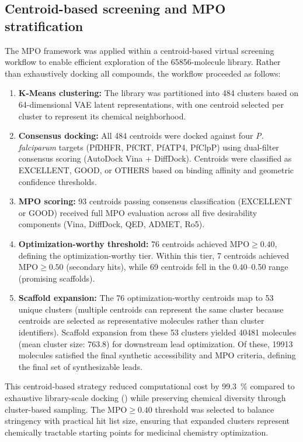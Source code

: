 \documentclass[journal=jcisd8,manuscript=suppinfo]{achemso}
\begin{document}
\subsection*{Centroid-based screening and MPO stratification}

The MPO framework was applied within a centroid-based virtual screening workflow to enable efficient exploration of the \num{65856}-molecule library. Rather than exhaustively docking all compounds, the workflow proceeded as follows:

\begin{enumerate}
\item \textbf{K-Means clustering:} The library was partitioned into \num{484} clusters based on \num{64}-dimensional VAE latent representations, with one centroid selected per cluster to represent its chemical neighborhood.
\item \textbf{Consensus docking:} All \num{484} centroids were docked against four \textit{P. falciparum} targets (PfDHFR, PfCRT, PfATP4, PfClpP) using dual-filter consensus scoring (AutoDock Vina + DiffDock). Centroids were classified as EXCELLENT, GOOD, or OTHERS based on binding affinity and geometric confidence thresholds.
\item \textbf{MPO scoring:} \num{93} centroids passing consensus classification (EXCELLENT or GOOD) received full MPO evaluation across all five desirability components (Vina, DiffDock, QED, ADMET, Ro5).
\item \textbf{Optimization-worthy threshold:} \num{76} centroids achieved $\text{MPO} \geq \num{0.40}$, defining the optimization-worthy tier. Within this tier, \num{7} centroids achieved $\text{MPO} \geq \num{0.50}$ (secondary hits), while \num{69} centroids fell in the \numrange{0.40}{0.50} range (promising scaffolds).
\item \textbf{Scaffold expansion:} The \num{76} optimization-worthy centroids map to \num{53} unique clusters (multiple centroids can represent the same cluster because centroids are selected as representative molecules rather than cluster identifiers). Scaffold expansion from these \num{53} clusters yielded \num{40481} molecules (mean cluster size: \num{763.8}) for downstream lead optimization. Of these, \num{19913} molecules satisfied the final synthetic accessibility and MPO criteria, defining the final set of synthesizable leads.
\end{enumerate}

This centroid-based strategy reduced computational cost by \qty{99.3}{\percent} compared to exhaustive library-scale docking () while preserving chemical diversity through cluster-based sampling. The $\text{MPO} \geq \num{0.40}$ threshold was selected to balance stringency with practical hit list size, ensuring that expanded clusters represent chemically tractable starting points for medicinal chemistry optimization.
\end{document}
